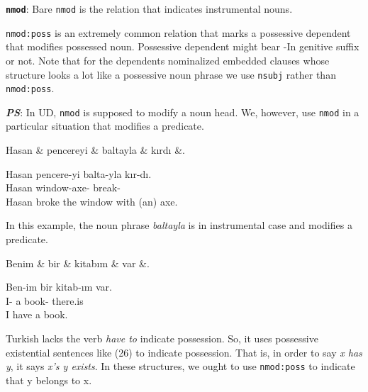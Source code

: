 \documentclass[11pt,a4paper]{article}
\begin{document}
\textbf{\texttt{nmod}}:
Bare \texttt{nmod} is the relation that indicates instrumental nouns.

\texttt{nmod:poss} is an extremely common relation that marks a possessive dependent that modifies possessed noun. Possessive dependent might bear -In genitive suffix or not. Note that for the dependents nominalized embedded clauses whose structure looks a lot like a possessive noun phrase we use \texttt{nsubj} rather than \texttt{nmod:poss}.

\textbf{\textit{PS}}: In UD, \texttt{nmod} is supposed to modify a noun head. We, however, use \texttt{nmod} in a particular situation that modifies a predicate.

\begin{exe}
\ex \label{nmod}
\begin{dependency}
\begin{deptext}[column sep=0.25cm]
Hasan \& pencereyi \& baltayla \& kırdı \&. \\
\end{deptext}
\end{dependency}
\gll Hasan pencere-yi balta-yla kır-dı.  \\
Hasan window-\Acc axe-\Ins{} break-\Pst{} \\
\glt Hasan broke the window with (an) axe.
\end{exe}

In this example, the noun phrase \textit{baltayla} is in instrumental case and modifies a predicate.

\begin{exe}
\ex \label{nmod:poss}
\begin{dependency}
\begin{deptext}[column sep=0.25cm]
Benim \& bir \& kitabım \& var \&. \\
\end{deptext}
\end{dependency}
\gll Ben-im bir kitab-ım var.  \\
I-\Gen{} a book-\Fsg{} there.is \\
\glt I have a book.
\end{exe}

Turkish lacks the verb \textit{have to} indicate possession. So, it uses possessive existential sentences like (26) to indicate possession. That is, in order to say \textit{x has y}, it says \textit{x’s y exists}. In these structures, we ought to use \texttt{nmod:poss} to indicate that y belongs to x.
\end{document}
